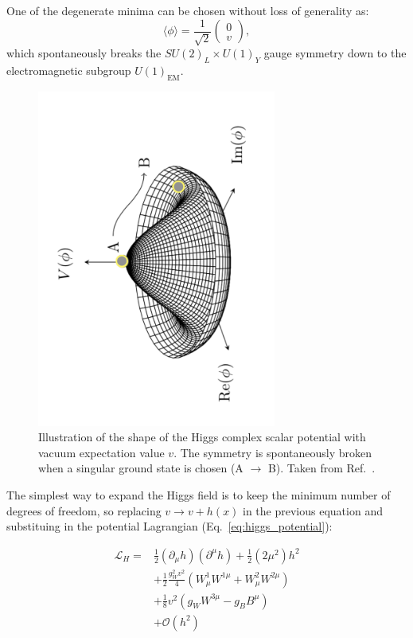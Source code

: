 One of the degenerate minima can be chosen without loss of generality as:
\begin{equation}
\langle \phi \rangle = \frac{1}{\sqrt{2}} \begin{pmatrix}
0 \\
v
\end{pmatrix},
\end{equation}
which spontaneously breaks the $SU(2)_L \times U(1)_Y$ gauge symmetry down to the electromagnetic subgroup $U(1)_{\text{EM}}$.

\begin{figure}[htbp]
  \centering
  \includegraphics[angle=-90,width=0.7\textwidth]{images/mexican_hat.pdf}
  \caption{Illustration of the shape of the Higgs complex scalar potential with vacuum expectation value $v$. The symmetry is spontaneously broken when a singular ground state is chosen (A $\rightarrow$ B). Taken from Ref.~\cite{}.}
  \label{fig:mexican_hat}
\end{figure}

The simplest way to expand the Higgs field is to keep the minimum number of degrees of freedom, so replacing $v\rightarrow v+h(x)$ in the previous equation and substituing in the potential Lagrangian (Eq.~\ref{eq:higgs_potential}): 

\begin{equation}
\begin{split}
\mathcal{L}_{H} = 
&\frac{1}{2}(\partial_{\mu}h)(\partial^{\mu}h) + \frac{1}{2}(2\mu^2)h^2\\  
& + \frac{1}{2}\frac{g^2_{W}v^2}{4}(W_{\mu}^1W^{1\mu}+W_{\mu}^2W^{2\mu})\\
& +\frac{1}{8}v^2(g_{W}W^{3\mu}-g_{B}B^{\mu})\\ 
& + \mathcal{O}(h^2)
\end{split} 
\label{eq:ew_broken}
\end{equation}

